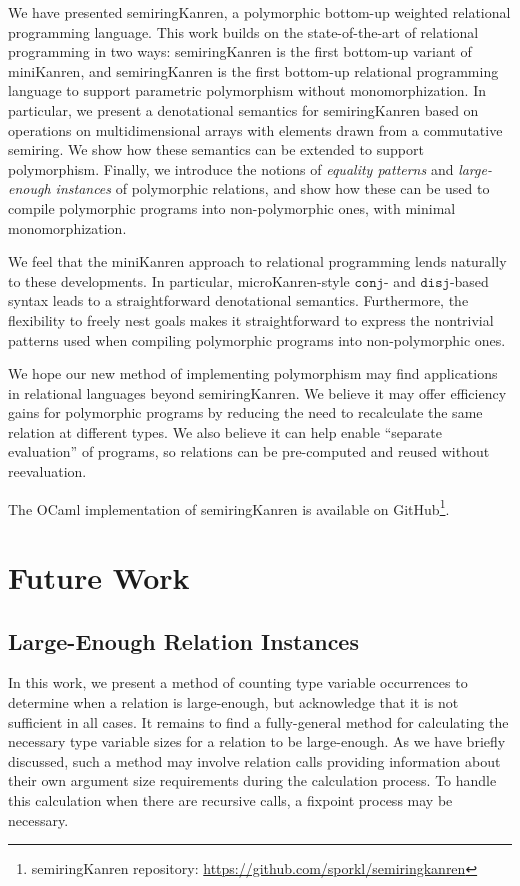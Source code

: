 \documentclass{report}
\theoremstyle{definition}
\begin{document}
We have presented semiringKanren, a polymorphic bottom-up weighted relational programming language.
This work builds on the state-of-the-art of relational programming in two ways:
semiringKanren is the first bottom-up variant of miniKanren,
and semiringKanren is the first bottom-up relational programming language to support parametric polymorphism without monomorphization.
In particular, we present a denotational semantics for semiringKanren based on operations on multidimensional arrays with elements drawn from a commutative semiring.
We show how these semantics can be extended to support polymorphism.
Finally, we introduce the notions of \emph{equality patterns} and \emph{large-enough instances} of polymorphic relations,
and show how these can be used to compile polymorphic programs into non-polymorphic ones, with minimal monomorphization.

We feel that the miniKanren approach to relational programming lends naturally to these developments.
In particular, microKanren-style \(\texttt{conj}\)- and \(\texttt{disj}\)-based syntax leads to a straightforward denotational semantics.
Furthermore, the flexibility to freely nest goals makes it straightforward to express the nontrivial patterns used when compiling polymorphic programs into non-polymorphic ones.

We hope our new method of implementing polymorphism may find applications in relational languages beyond semiringKanren.
We believe it may offer efficiency gains for polymorphic programs by reducing the need to recalculate the same relation at different types.
We also believe it can help enable ``separate evaluation'' of programs, so relations can be pre-computed and reused without reevaluation.

The OCaml implementation of semiringKanren is available on GitHub\footnote{semiringKanren repository: \url{https://github.com/sporkl/semiringkanren}}.

\section{Future Work}

\subsection{Large-Enough Relation Instances}

In this work, we present a method of counting type variable occurrences to determine when a relation is large-enough, but acknowledge that it is not sufficient in all cases.
It remains to find a fully-general method for calculating the necessary type variable sizes for a relation to be large-enough.
As we have briefly discussed, such a method may involve relation calls providing information about their own argument size requirements during the calculation process.
To handle this calculation when there are recursive calls, a fixpoint process may be necessary.
\end{document}
